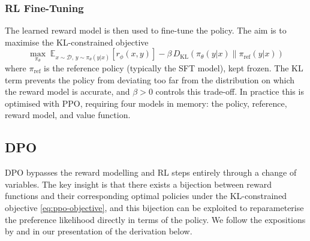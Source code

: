 \documentclass[11pt]{article}
\begin{document}
\subsubsection{RL Fine-Tuning}
The learned reward model is then used to fine-tune the policy. The aim is to maximise the KL-constrained objective
\begin{equation}
    \max_{\pi_\theta} \; \mathbb{E}_{x \sim \mathcal{D},\, y \sim \pi_{\theta}(y | x)} \left[r_{\phi}(x, y)\right] - \beta \, D_{\text{KL}}\!\left(\pi_{\theta}(y | x) \| \pi_{\text{ref}}(y | x)\right)
    \label{eq:ppo-objective}
\end{equation}
where $\pi_{\text{ref}}$ is the reference policy (typically the SFT model), kept frozen. The KL term prevents the policy from deviating too far from the distribution on which the reward model is accurate, and $\beta > 0$ controls this trade-off. In practice this is optimised with PPO, requiring four models in memory: the policy, reference, reward model, and value function.

\subsection{DPO}
DPO \autocite{rafailov2024directpreferenceoptimizationlanguage} bypasses the reward modelling and RL steps entirely through a change of variables. The key insight is that there exists a bijection between reward functions and their corresponding optimal policies under the KL-constrained objective \eqref{eq:ppo-objective}, and this bijection can be exploited to reparameterise the preference likelihood directly in terms of the policy. We follow the expositions by \autocite{wolfe2025dpo} and \autocite{romero2024dpo} in our presentation of the derivation below.
\end{document}
